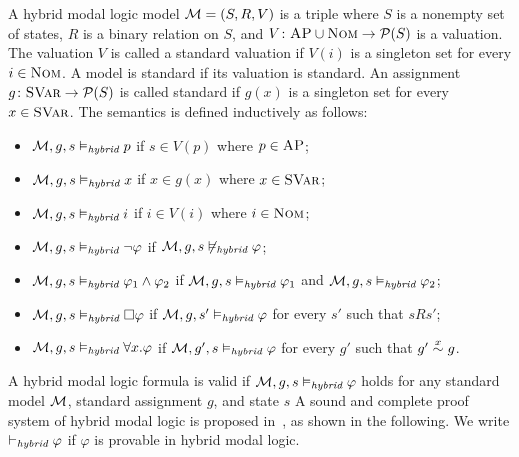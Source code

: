 \documentclass{amsart}
\begin{document}
A hybrid modal logic model
$\mathcal{M} = (S, R, V)$ is a triple where
$S$ is a nonempty set of states,
$R$ is a binary relation on $S$,
and $V \colon \textsc{AP} \cup \textnormal{\textsc{Nom}} \to \mathcal{P}(S)$ is a valuation.
The valuation $V$ is called a standard valuation if $V(i)$ is a singleton set
for every $i \in \textnormal{\textsc{Nom}}$.
A model is standard if its valuation is standard.
An assignment $g \colon {\normalfont\textsc{SVar}} \to \mathcal{P}(S)$ is called standard
if $g(x)$ is a singleton set for every $x \in {\normalfont\textsc{SVar}}$.
The semantics is defined inductively as follows:
\begin{itemize}
	\item $\mathcal{M},g,s \vDash_{\textit{hybrid}} p$
	if $s \in V(p)$ where $p \in \textsc{AP}$;
	\item $\mathcal{M},g,s \vDash_{\textit{hybrid}} x$
	if $x \in g(x)$ where $x \in {\normalfont\textsc{SVar}}$;
	\item $\mathcal{M},g,s \vDash_{\textit{hybrid}} i$
	if $i \in V(i)$ where $i \in \textnormal{\textsc{Nom}}$;
	\item $\mathcal{M},g,s \vDash_{\textit{hybrid}} \neg \varphi$
	if $\mathcal{M},g,s \not \vDash_{\textit{hybrid}} \varphi$;
	\item $\mathcal{M},g,s \vDash_{\textit{hybrid}} \varphi_1 \wedge \varphi_2$
	if  $\mathcal{M},g,s \vDash_{\textit{hybrid}} \varphi_1$
	and $\mathcal{M},g,s \vDash_{\textit{hybrid}} \varphi_2$;
	\item $\mathcal{M},g,s \vDash_{\textit{hybrid}} {\square} \varphi$
	if $\mathcal{M},g,s' \vDash_{\textit{hybrid}} \varphi$
	for every $s'$ such that $s R s'$;
	\item $\mathcal{M},g,s \vDash_{\textit{hybrid}} \forall x . \varphi$
	if $\mathcal{M},g',s \vDash_{\textit{hybrid}} \varphi$
	for every $g'$ such that $g' \overset{x}{\sim} g$.
\end{itemize}
A hybrid modal logic formula is valid
if $\mathcal{M},g,s \vDash_{\textit{hybrid}} \varphi$ 
holds for any standard model $\mathcal{M}$, standard assignment $g$, and state $s$
A sound and complete proof system of hybrid modal logic
is proposed in~\cite{}, as shown in the following.
We write $\vdash_{\textit{hybrid}} \varphi$ if $\varphi$ is provable in hybrid
modal logic.
\end{document}
